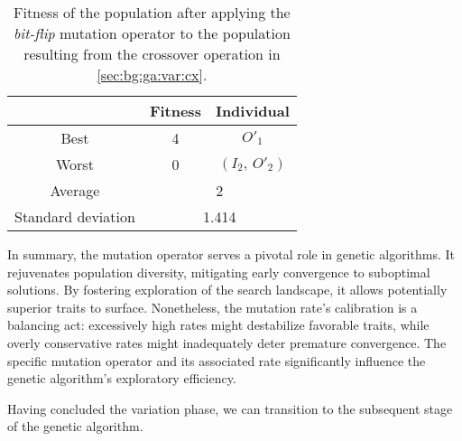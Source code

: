   \begin{table}[H]
    \centering
    \begin{tabular}{|c|c|c|}
      \hline
            & \textbf{Fitness} & \textbf{Individual}  \\
      \hline
      Best  & 4 & \(O'_1\) \\
      Worst & 0 & \((I_2,\, O'_2)\) \\
      \hline
      \hline
      Average & \multicolumn{2}{c|}{2} \\
      \hline
      Standard deviation & \multicolumn{2}{c|}{1.414} \\
      \hline
    \end{tabular}
    \caption{
      Fitness of the population after applying the \emph{bit-flip} mutation 
      operator to the population resulting from the crossover operation in
      \vref{sec:bg:ga:var:cx}.
    }
    \label{tab:bg:ga:var:mut:fitness}
  \end{table}

  In summary, the mutation operator serves a pivotal role in genetic 
  algorithms.
  It rejuvenates population diversity, mitigating early convergence to 
  suboptimal solutions.
  By fostering exploration of the search landscape, it allows potentially 
  superior traits to surface.
  Nonetheless, the mutation rate's calibration is a balancing act: excessively 
  high rates might destabilize favorable traits, while overly conservative 
  rates might inadequately deter premature convergence.
  The specific mutation operator and its associated rate significantly 
  influence the genetic algorithm's exploratory efficiency.

  Having concluded the variation phase, we can transition to the subsequent 
  stage of the genetic algorithm.
